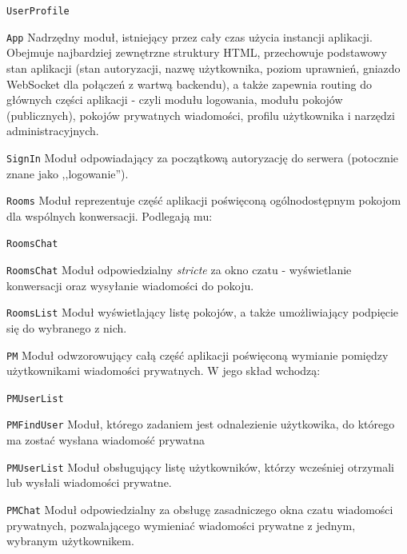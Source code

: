 \begin{labeling}{\texttt{UserProfile}}

  \item[\texttt{App}] Nadrzędny moduł, istniejący przez cały czas użycia
	instancji aplikacji. Obejmuje najbardziej zewnętrzne struktury HTML,
	przechowuje podstawowy stan aplikacji (stan autoryzacji, nazwę
	użytkownika, poziom uprawnień, gniazdo WebSocket dla połączeń
	z wartwą backendu), a także zapewnia routing do głównych części
	aplikacji - czyli modułu logowania, modułu pokojów (publicznych),
	pokojów prywatnych wiadomości, profilu użytkownika i narzędzi
	administracyjnych.

	\item[\texttt{SignIn}] Moduł odpowiadający za początkową autoryzację
	do serwera (potocznie znane jako ,,logowanie'').

	\item[\texttt{Rooms}] Moduł reprezentuje część aplikacji poświęconą
	ogólnodostępnym pokojom dla wspólnych konwersacji. Podlegają mu:

	\begin{labeling}{\texttt{RoomsChat}}
		\item[\texttt{RoomsChat}] Moduł odpowiedzialny \textit{stricte} za
		okno czatu - wyświetlanie konwersacji oraz wysyłanie wiadomości
		do pokoju.

		\item[\texttt{RoomsList}] Moduł wyświetlający listę pokojów, a także
		umożliwiający podpięcie się do wybranego z nich.

	\end{labeling}

	\item[\texttt{PM}] Moduł odwzorowujący całą część aplikacji poświęconą
	wymianie pomiędzy użytkownikami wiadomości prywatnych. W jego skład
	wchodzą:

	\begin{labeling}{\texttt{PMUserList}}
		\item[\texttt{PMFindUser}] Moduł, którego zadaniem jest odnalezienie
		użytkowika, do którego ma zostać wysłana wiadomość prywatna

		\item[\texttt{PMUserList}] Moduł obsługujący listę użytkowników,
		którzy wcześniej otrzymali lub wysłali wiadomości prywatne.

		\item[\texttt{PMChat}] Moduł odpowiedzialny za obsługę zasadniczego
		okna czatu wiadomości prywatnych, pozwalającego wymieniać wiadomości
		prywatne z jednym, wybranym użytkownikem.
	\end{labeling}


\end{labeling}
